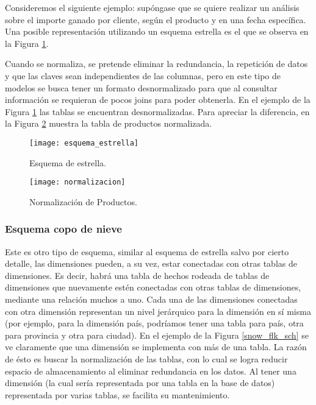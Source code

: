 \documentclass[a4paper,11pt]{article}
\begin{document}
    Consideremos el siguiente ejemplo: supóngase que se quiere realizar un análisis sobre el importe ganado por cliente, según el producto y en una fecha
    específica. Una posible representación utilizando un esquema estrella es el que se observa en la Figura \ref{star_sch}.
    
    Cuando se normaliza, se pretende eliminar la redundancia, la repetición de datos y que las claves sean independientes de
    las columnas, pero en este tipo de modelos se busca tener un formato desnormalizado para que al consultar información se requieran de pocos joins para
    poder obtenerla. En el ejemplo de la Figura \ref{star_sch} las tablas se encuentran desnormalizadas. Para apreciar la
    diferencia, en la Figura \ref{normalizado} muestra la tabla de productos normalizada.
    
    \begin{figure}
      \begin{center}
        \texttt{[image: esquema\_estrella]}
        \caption{Esquema de estrella. \cite{dim_models}}
        \label{star_sch}
      \end{center}
    \end{figure}
    
    \begin{figure}
      \begin{center}
        \texttt{[image: normalizacion]}
        \caption{Normalización de Productos. \cite{dim_models}}
        \label{normalizado}
      \end{center}
    \end{figure}
    
    
    \subsubsection{Esquema copo de nieve}
    
    Este es otro tipo de esquema, similar al esquema de estrella salvo por cierto detalle, las dimensiones pueden, a su vez, estar conectadas con otras 
    tablas de dimensiones. Es decir, habrá una tabla de hechos rodeada de tablas de dimensiones que nuevamente estén conectadas con otras tablas de 
    dimensiones, mediante una relación muchos a uno. Cada una de las dimensiones conectadas con otra dimensión representan un nivel jerárquico para la dimensión en 
    sí misma (por ejemplo, para la dimensión país, podríamos tener una tabla para país, otra para provincia y otra para ciudad). En el ejemplo de la Figura 
    \ref{snow_flk_sch} se ve claramente que una dimensión se implementa con más de una tabla. La razón de ésto es buscar la normalización de las tablas, con 
    lo cual se logra reducir espacio de almacenamiento al eliminar redundancia en los datos. Al tener una dimensión (la cual sería representada por una tabla 
    en la base de datos) representada por varias tablas, se facilita su mantenimiento.
    
\end{document}

